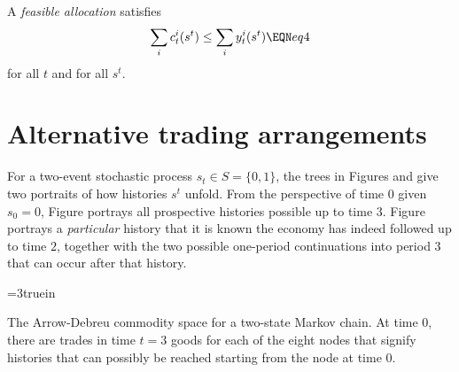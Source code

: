 

A {\it feasible allocation} satisfies
$$\sum_i c_t^i(s^t) \leq \sum_i y_t^i(s^t)  \EQN eq4 $$
for all $t$ and for all $s^t$.


\section{Alternative trading arrangements}
For a two-event stochastic process $s_t \in S = \{0, 1\}$, the
trees in Figures  and  %
 give
two portraits of how histories $s^t$ unfold.  From the
perspective of time $0$ given $s_0=0$, Figure  portrays
all prospective histories possible up to time
$3$. Figure  portrays  a {\it particular\/} history that it is
known the economy has indeed followed up to   time $2$, together
with the  two possible one-period continuations into period $3$
that can occur after that history.


\centerline{\epsfxsize=3truein} \caption{The
Arrow-Debreu commodity space for a two-state Markov chain. At time
$0$, there are trades in time $t=3$ goods for each of the eight
nodes that signify histories that can possibly be reached starting from
the node at time $0$.} 
\endfigure



